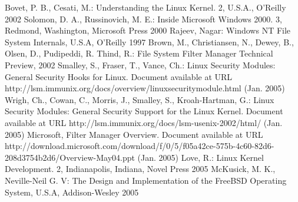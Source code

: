 \begin{thebibliography}{99}
	 Bovet, P. B., Cesati, M.: Understanding the Linux Kernel. 2, U.S.A., O'Reilly 2002
	 Solomon, D. A., Russinovich, M. E.: Inside Microsoft Windows 2000. 3, Redmond, Washington, Microsoft Press 2000
	 Rajeev, Nagar: Windows NT File System Internals, U.S.A, O'Reilly 1997
	 Brown, M., Christiansen, N., Dewey, B., Olsen, D., Pudipeddi, R. Thind, R.: File System Filter Manager Technical Preview, 2002
	 Smalley, S., Fraser, T., Vance, Ch.: Linux Security Modules:
		General Security Hooks for Linux. Document available at URL
		http://lsm.immunix.org/docs/overview/linuxsecuritymodule.html (Jan. 2005)
	 Wrigh, Ch., Cowan, C., Morris, J., Smalley, S., Kroah-Hartman,
		G.: Linux Security Modules: General Security Support for the Linux
		Kernel. Document available at URL
		http://lsm.immunix.org/docs/lsm-usenix-2002/html/ (Jan. 2005)
	 Microsoft, Filter Manager Overview. Document available at URL
		http://download.microsoft.com/download/f/0/5/f05a42ce-575b-4c60-82d6-208d3754b2d6/Overview-May04.ppt
		(Jan. 2005)
	 Love, R.: Linux Kernel Development. 2, Indianapolis, Indiana,
		Novel Press 2005
	McKusick, M. K., Neville-Neil G. V: The Design and
		Implementation of the FreeBSD Operating System, U.S.A, Addison-Wesley
		2005
\end{thebibliography}

